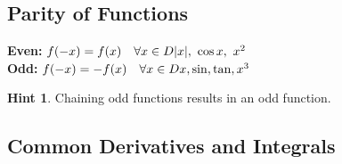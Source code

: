 \documentclass[a4paper, 10pt]{article}
\theoremstyle{definition}
\newtheorem*{note_wrapper}{Hint}
\theoremstyle{named}
\newenvironment{note}%
    {\begin{mdframed}[style=trick]\begin{note_wrapper}}%
    {\end{note_wrapper}\end{mdframed}}
\begin{document}
\subsection*{Parity of Functions}
\textbf{Even:} $f(-x) = f(x) \quad \forall x \in D \hfill |x|, \ \cos x, \ x^2$ \\
\textbf{Odd:} $f(-x) = -f(x) \quad \forall x \in D \hfill x, \sin, \tan, x^3$

\begin{note}
    Chaining odd functions results in an odd function.
\end{note}

\subsection*{Common Derivatives and Integrals}
\renewcommand{\arraystretch}{1.5}
\end{document}
